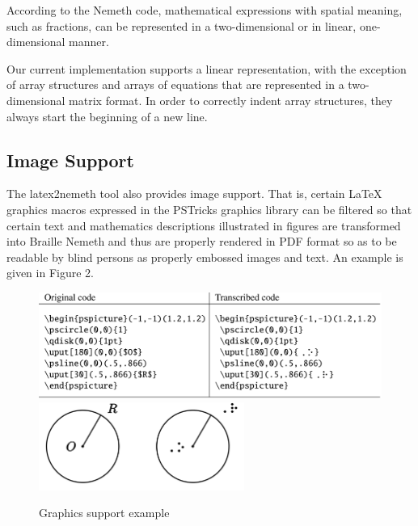\documentclass[11.5pt]{sig-alternate} %
\begin{document}
\begin{large}
According to the Nemeth code, mathematical expressions with spatial meaning, such as fractions, can be represented in a two-dimensional or in linear, one-dimensional manner.

Our current implementation supports a linear representation, with the exception of array structures and arrays of equations that are represented in a two-dimensional matrix format. In order to correctly indent array structures, they always start the beginning of a new line.

\subsection*{Image Support}

The latex2nemeth tool also provides image support. That is, certain LaTeX graphics macros expressed in the PSTricks graphics library can be filtered so that certain text and mathematics descriptions illustrated in figures are transformed into Braille Nemeth and thus are properly rendered in PDF format so as to be readable by blind persons as properly embossed images and text. An example is given in Figure 2.

\begin{figure}[h]
    \centering
    \includegraphics[width=1\textwidth]{images/fig2a.png}
    \includegraphics[width=0.6\textwidth]{images/fig2b.png}
    \caption{Graphics support example}
\end{figure}


\end{large}
\end{document}
